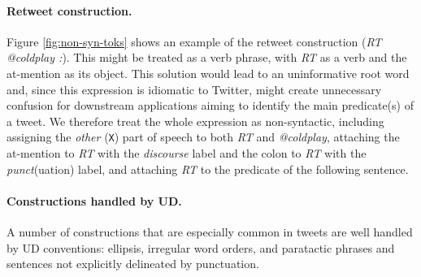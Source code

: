 \documentclass[11pt,a4paper]{article}
\newcommand{\yjcomment}[1]{\textcolor{orange}{[$_\mathrm{L}^\mathrm{Y}$#1]}}
\newcommand{\nascomment}[1]{\textcolor{blue}{[#1 ---\textsc{nas}]}}
\newcommand{\yicomment}[1]{\textcolor{gray}{[#1 ---\textsc{Yi}]}}
\begin{document}
\paragraph{Retweet construction.} Figure \ref{fig:non-syn-toks} shows
an example of the retweet construction (\emph{RT @coldplay :}).  This
might be treated as a verb phrase, with \emph{RT} as a verb and the
at-mention as its object.
  This solution would lead to an uninformative root
word and, since this expression is idiomatic to Twitter, might create
unnecessary confusion for downstream applications aiming to identify
the main predicate(s) of a tweet.  We therefore treat the whole
expression as non-syntactic, including assigning the \emph{other}
(\texttt{X}) part of speech to both \emph{RT} and \emph{@coldplay},
attaching the at-mention to \emph{RT} with the \emph{discourse}
label and the colon to \emph{RT} with the \emph{punct}(uation) label,
and attaching \emph{RT} to the predicate of the following sentence.



\paragraph{Constructions handled by UD.}  A number of constructions
that are especially common in tweets are well handled by UD
conventions: ellipsis, irregular word orders, and paratactic phrases
and sentences 
not explicitly delineated by punctuation.
	
\end{document}
